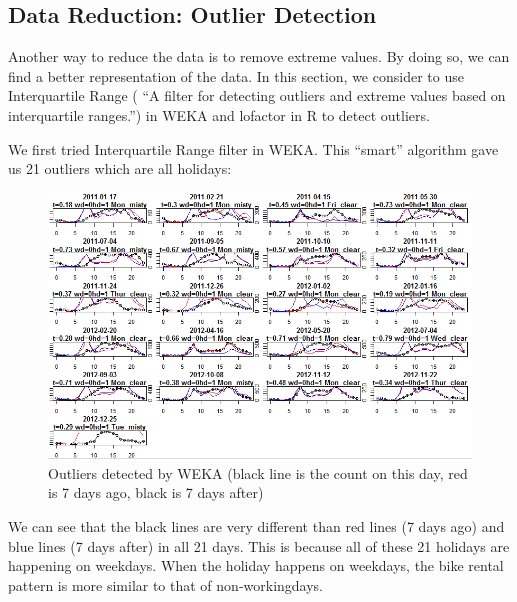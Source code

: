 \documentclass[12pt]{article}
\begin{document}
	\subsection{Data Reduction: Outlier Detection}
	Another way to reduce the data is to remove extreme values. By doing so, we can find a better representation of the data. In this section, we consider to use Interquartile Range ( ``A filter for detecting outliers and extreme values based on interquartile ranges.'') in WEKA  and lofactor in R to detect outliers.  
	
	We first tried Interquartile Range filter in WEKA. This ``smart'' algorithm gave us 21 outliers which are all holidays:
		\begin{figure}[H]
			\centering
			\includegraphics[scale=.65]{figures/outlier_weka_holliday.png}
			\caption{Outliers detected by WEKA (black line is the count on this day, red is 7 days ago, black is 7 days after)}
		\end{figure}
	We can see that the black lines are very different than red lines (7 days ago) and blue lines (7 days after) in all 21 days. This is because all of these 21 holidays are happening on weekdays. When the holiday happens on weekdays, the bike rental pattern is more similar to that of non-workingdays.
	
\end{document}
